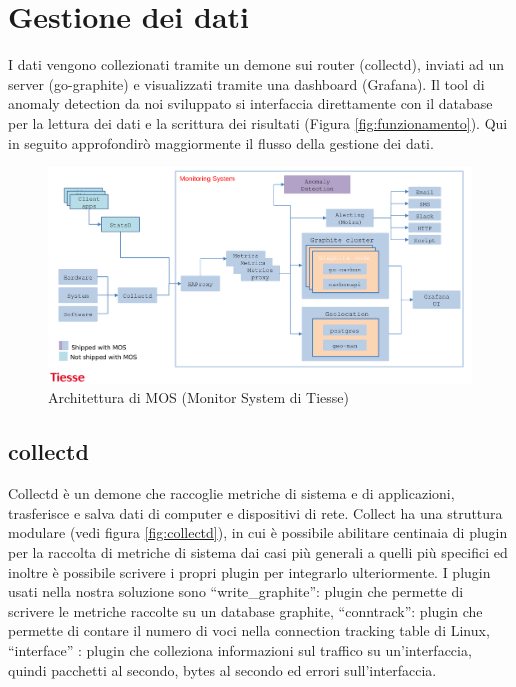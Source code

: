 \section{Gestione dei dati}

I dati vengono collezionati tramite un demone sui router (collectd), inviati ad un server (go-graphite) e visualizzati tramite una dashboard (Grafana). Il tool di anomaly detection da noi sviluppato si interfaccia direttamente con il database per la lettura dei dati e la scrittura dei risultati (Figura \ref{fig:funzionamento}).
Qui in seguito approfondirò maggiormente il flusso della gestione dei dati.

\begin{figure}[]
    \label{fig:mos}
    \includegraphics[width=\hsize]{images/my_work/tiesse_mos.png}
    \caption{Architettura di MOS (Monitor System di Tiesse)}
    \centering
\end{figure}

\subsection{collectd}



Collectd è un demone che raccoglie metriche di sistema e di applicazioni, trasferisce e salva dati di computer e dispositivi di rete. Collect ha una struttura modulare (vedi figura \ref{fig:collectd}), in cui è possibile abilitare centinaia di plugin per la raccolta di metriche di sistema dai casi più generali a quelli più specifici ed inoltre è possibile scrivere i propri plugin per integrarlo ulteriormente. I plugin usati nella nostra soluzione sono ``write\_graphite'': plugin che permette di scrivere le metriche raccolte su un database graphite, ``conntrack'': plugin che permette di contare il numero di voci nella connection tracking table di Linux, ``interface'' : plugin che colleziona informazioni sul traffico su un'interfaccia, quindi pacchetti al secondo, bytes al secondo ed errori sull'interfaccia. 

